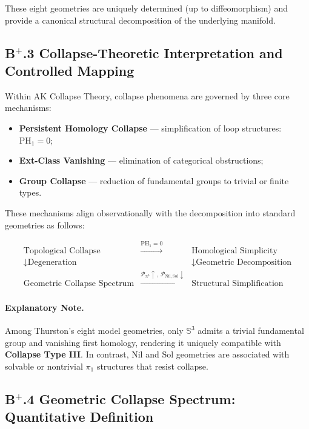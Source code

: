 \documentclass[11pt]{article}
\begin{document}
These eight geometries are uniquely determined (up to diffeomorphism) and provide a canonical structural decomposition of the underlying manifold.

\subsection*{B$^{+}$.3 Collapse-Theoretic Interpretation and Controlled Mapping}

Within AK Collapse Theory, collapse phenomena are governed by three core mechanisms:

\begin{itemize}
    \item \textbf{Persistent Homology Collapse} — simplification of loop structures: $\mathrm{PH}_1 = 0$;
    \item \textbf{Ext-Class Vanishing} — elimination of categorical obstructions;
    \item \textbf{Group Collapse} — reduction of fundamental groups to trivial or finite types.
\end{itemize}

These mechanisms align observationally with the decomposition into standard geometries as follows:

\[
\begin{array}{ccc}
\text{Topological Collapse} & \xrightarrow{\mathrm{PH}_1 = 0} & \text{Homological Simplicity} \\
\downarrow \text{Degeneration} & & \downarrow \text{Geometric Decomposition} \\
\text{Geometric Collapse Spectrum} & \xrightarrow{\mathcal{P}_{\mathbb{S}^3} \uparrow,\;\mathcal{P}_{\mathrm{Nil},\mathrm{Sol}} \downarrow} & \text{Structural Simplification}
\end{array}
\]

\paragraph{Explanatory Note.}  
Among Thurston's eight model geometries, only $\mathbb{S}^3$ admits a trivial fundamental group and vanishing first homology, rendering it uniquely compatible with \textbf{Collapse Type III}. In contrast, $\mathrm{Nil}$ and $\mathrm{Sol}$ geometries are associated with solvable or nontrivial $\pi_1$ structures that resist collapse.

\subsection*{B$^{+}$.4 Geometric Collapse Spectrum: Quantitative Definition}
\end{document}
